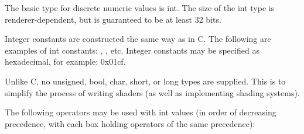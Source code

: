 \documentclass[11pt,letterpaper]{book}
\def\inttype{{\cf int}\xspace}
\begin{document}
The basic type for discrete numeric values is {\cf int}.  The size of
the {\cf int} type is renderer-dependent, but is guaranteed to be at
least 32 bits.

Integer constants are constructed the same way as in C.  The following
are examples of {\cf int} constants: {}, {}, etc. Integer
constants may be specified as hexadecimal, for example: {\cf 0x01cf}.

Unlike C, no unsigned, bool, char, short, or long types are supplied.
This is to simplify the process of writing shaders (as well as
implementing shading systems).

The following operators may be used with \inttype values (in order of
decreasing precedence, with each box holding operators of the same
precedence):

\smallskip
\end{document}
